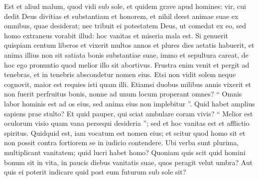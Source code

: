 \begin{biblechapter}
\begin{biblechapter}
\begin{biblechapter}
\begin{biblechapter}
\begin{biblechapter}
\begin{biblechapter}
\verse Est et aliud malum, quod vidi sub sole, et quidem grave apud homines: 
 \verse vir, cui dedit Deus divitias et substantiam et honorem, et nihil deest animae suae ex omnibus, quae desiderat; nec tribuit ei potestatem Deus, ut comedat ex eo, sed homo extraneus vorabit illud: hoc vanitas et miseria mala est. 
\verse Si genuerit quispiam centum liberos et vixerit multos annos et plures dies aetatis habuerit, et anima illius non sit satiata bonis substantiae suae, immo et sepultura careat, de hoc ego pronuntio quod melior illo sit abortivus. 
\verse Frustra enim venit et pergit ad tenebras, et in tenebris abscondetur nomen eius. 
 \verse Etsi non vidit solem neque cognovit, maior est requies isti quam illi. 
\verse Etiamsi duobus milibus annis vixerit et non fuerit perfruitus bonis, nonne ad unum locum properant omnes?
 \verse “ Omnis labor hominis est ad os eius,
 sed anima eius non implebitur ”.
 \verse Quid habet amplius sapiens prae stulto? Et quid pauper, qui sciat ambulare coram vivis? 
\verse “ Melior est oculorum visio quam vana persequi desideria ”; sed et hoc vanitas est et afflictio spiritus. 
\verse Quidquid est, iam vocatum est nomen eius; et scitur quod homo sit et non possit contra fortiorem se in iudicio contendere. 
\verse Ubi verba sunt plurima, multiplicant vanitatem; quid lucri habet homo? 
\verse Quoniam quis scit quid homini bonum sit in vita, in paucis diebus vanitatis suae, quos peragit velut umbra? Aut quis ei poterit indicare quid post eum futurum sub sole sit?
 

\end{biblechapter}
\end{biblechapter}
\end{biblechapter}
\end{biblechapter}
\end{biblechapter}
\end{biblechapter}
